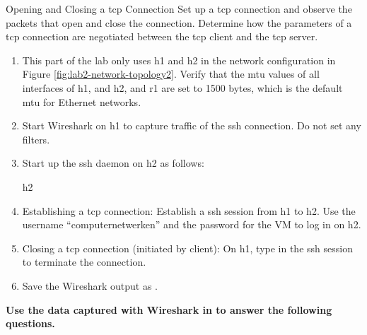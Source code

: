 \begin{exercise}{Opening and Closing a \ac{tcp} Connection}
Set up a \ac{tcp} connection and observe the packets that open and close the connection. Determine how the parameters of a \ac{tcp} connection are negotiated between the \ac{tcp} client and the \ac{tcp} server.

\begin{enumerate}
	\item This part of the lab only uses h1 and h2 in the network configuration in Figure \ref{fig:lab2-network-topology2}.
	Verify that the \ac{mtu} values of all interfaces of h1, and h2, and r1 are set to 1500 bytes, which is the default \ac{mtu} for Ethernet networks.
	\item Start Wireshark on h1 to capture traffic of the ssh connection. Do not set any filters.
	\item Start up the ssh daemon on h2 as follows:
	\begin{cmdblock}[gobble=2]
		h2%
	\end{cmdblock}
	\item Establishing a \ac{tcp} connection: Establish a ssh session from h1 to h2. Use the username ``computernetwerken'' and the password for the VM to log in on h2.
	\item Closing a \ac{tcp} connection (initiated by client): On h1, type  in the ssh session to terminate the connection.
	\item Save the Wireshark output as .
\end{enumerate}

\textbf{Use the data captured with Wireshark in  to answer the following questions.}

\end{exercise}

